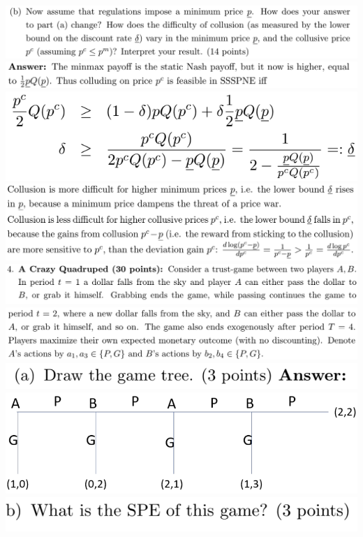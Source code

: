 \documentclass[8pt,landscape]{extarticle}
\begin{document}
\begin{multicols*}{3}
    \includegraphics[width=0.76\linewidth,keepaspectratio]{Screenshots/Screenshot 2024-03-11 172017.png}
    \includegraphics[width=0.72\linewidth,keepaspectratio]{Screenshots/Screenshot 2024-03-11 172022.png}
    \includegraphics[width=0.43\linewidth,keepaspectratio]{Screenshots/Screenshot 2024-03-11 172027.png}
    \includegraphics[width=0.71\linewidth,keepaspectratio]{Screenshots/Screenshot 2024-03-11 172031.png}
    \includegraphics[width=0.77\linewidth,keepaspectratio]{Screenshots/Screenshot 2024-03-11 172037.png}
    \includegraphics[width=0.75\linewidth,keepaspectratio]{Screenshots/Screenshot 2024-03-11 172042.png}
    \includegraphics[width=0.4\linewidth,keepaspectratio]{Screenshots/Screenshot 2024-03-11 172046.png}
    \includegraphics[width=0.63\linewidth,keepaspectratio]{Screenshots/Screenshot 2024-03-11 172052.png}
    \includegraphics[width=0.38\linewidth,keepaspectratio]{Screenshots/Screenshot 2024-03-11 172059.png}

\end{multicols*}
\end{document}
